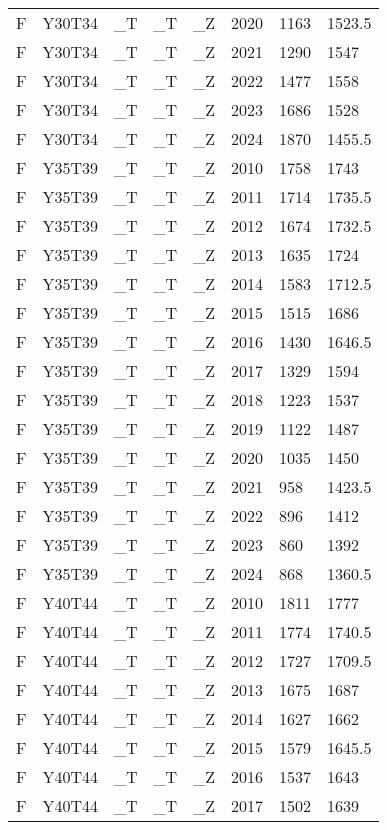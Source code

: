\begin{longtable}[t]{llllllll}
\addlinespace
F & Y30T34 & \_T & \_T & \_Z & 2020 & 1163 & 1523.5\\
F & Y30T34 & \_T & \_T & \_Z & 2021 & 1290 & 1547\\
F & Y30T34 & \_T & \_T & \_Z & 2022 & 1477 & 1558\\
F & Y30T34 & \_T & \_T & \_Z & 2023 & 1686 & 1528\\
F & Y30T34 & \_T & \_T & \_Z & 2024 & 1870 & 1455.5\\
\addlinespace
F & Y35T39 & \_T & \_T & \_Z & 2010 & 1758 & 1743\\
F & Y35T39 & \_T & \_T & \_Z & 2011 & 1714 & 1735.5\\
F & Y35T39 & \_T & \_T & \_Z & 2012 & 1674 & 1732.5\\
F & Y35T39 & \_T & \_T & \_Z & 2013 & 1635 & 1724\\
F & Y35T39 & \_T & \_T & \_Z & 2014 & 1583 & 1712.5\\
\addlinespace
F & Y35T39 & \_T & \_T & \_Z & 2015 & 1515 & 1686\\
F & Y35T39 & \_T & \_T & \_Z & 2016 & 1430 & 1646.5\\
F & Y35T39 & \_T & \_T & \_Z & 2017 & 1329 & 1594\\
F & Y35T39 & \_T & \_T & \_Z & 2018 & 1223 & 1537\\
F & Y35T39 & \_T & \_T & \_Z & 2019 & 1122 & 1487\\
\addlinespace
F & Y35T39 & \_T & \_T & \_Z & 2020 & 1035 & 1450\\
F & Y35T39 & \_T & \_T & \_Z & 2021 & 958 & 1423.5\\
F & Y35T39 & \_T & \_T & \_Z & 2022 & 896 & 1412\\
F & Y35T39 & \_T & \_T & \_Z & 2023 & 860 & 1392\\
F & Y35T39 & \_T & \_T & \_Z & 2024 & 868 & 1360.5\\
\addlinespace
F & Y40T44 & \_T & \_T & \_Z & 2010 & 1811 & 1777\\
F & Y40T44 & \_T & \_T & \_Z & 2011 & 1774 & 1740.5\\
F & Y40T44 & \_T & \_T & \_Z & 2012 & 1727 & 1709.5\\
F & Y40T44 & \_T & \_T & \_Z & 2013 & 1675 & 1687\\
F & Y40T44 & \_T & \_T & \_Z & 2014 & 1627 & 1662\\
\addlinespace
F & Y40T44 & \_T & \_T & \_Z & 2015 & 1579 & 1645.5\\
F & Y40T44 & \_T & \_T & \_Z & 2016 & 1537 & 1643\\
F & Y40T44 & \_T & \_T & \_Z & 2017 & 1502 & 1639\\

\end{longtable}
